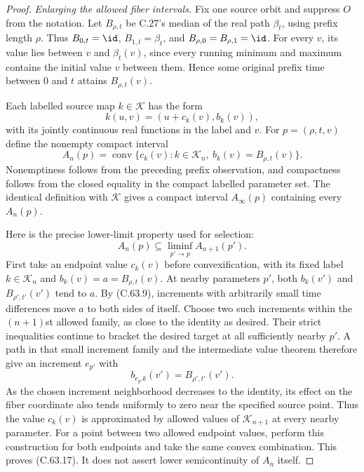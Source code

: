 \begin{proof}
\emph{Enlarging the allowed fiber intervals.}
Fix one source orbit and suppress $O$ from the
notation. Let $B_{\rho,t}$ be C.27's median of
the real path $\beta_t$, using prefix length
$\rho$. Thus $B_{0,t}=\id$, $B_{1,t}=\beta_t$,
and $B_{\rho,0}=B_{\rho,1}=\id$.
For every $v$, its value lies between $v$ and
$\beta_t(v)$, since every running minimum and
maximum contains the initial value $v$ between
them. Hence some original prefix time between
$0$ and $t$ attains $B_{\rho,t}(v)$.

Each labelled source map $k\in\mathcal K$ has
the form
\[
                    k(u,v)=(u+c_k(v),b_k(v)),
                                                               \tag{C.63.15}
\]
with its jointly continuous real functions in
the label and $v$. For $p=(\rho,t,v)$ define
the nonempty compact interval
\[
 A_n(p)=\operatorname{conv}
       \{c_k(v):k\in\mathcal K_n,
                          \ b_k(v)=B_{\rho,t}(v)\}.
                                                               \tag{C.63.16}
\]
Nonemptiness follows from the preceding prefix
observation, and compactness follows from the
closed equality in the compact labelled
parameter set. The identical definition with
$\mathcal K$ gives a compact interval
$A_\infty(p)$ containing every $A_n(p)$.

Here is the precise lower-limit property used
for selection:
\[
             A_n(p)\subseteq
                    \liminf_{p'\to p}A_{n+1}(p').       \tag{C.63.17}
\]
First take an endpoint value $c_k(v)$ before
convexification, with its fixed label
$k\in\mathcal K_n$ and $b_k(v)=a=B_{\rho,t}(v)$.
At nearby parameters $p'$, both $b_k(v')$ and
$B_{\rho',t'}(v')$ tend to $a$. By (C.63.9),
increments with arbitrarily small time
differences move $a$ to both sides of itself.
Choose two such increments within the
$(n+1)$st allowed family, as close to the
identity as desired. Their strict inequalities
continue to bracket the desired target at
all sufficiently nearby $p'$. A path in that
small increment family and the intermediate
value theorem therefore give an increment
$e_{p'}$ with
\[
          b_{e_{p'}k}(v')=B_{\rho',t'}(v').
                                                               \tag{C.63.18}
\]
As the chosen increment neighborhood decreases
to the identity, its effect on the fiber
coordinate also tends uniformly to zero near
the specified source point. Thus the value
$c_k(v)$ is approximated by allowed values
of $\mathcal K_{n+1}$ at every nearby parameter.
For a point between two allowed endpoint
values, perform this construction for both
endpoints and take the same convex combination.
This proves (C.63.17). It does not assert
lower semicontinuity of $A_n$ itself.


\end{proof}
